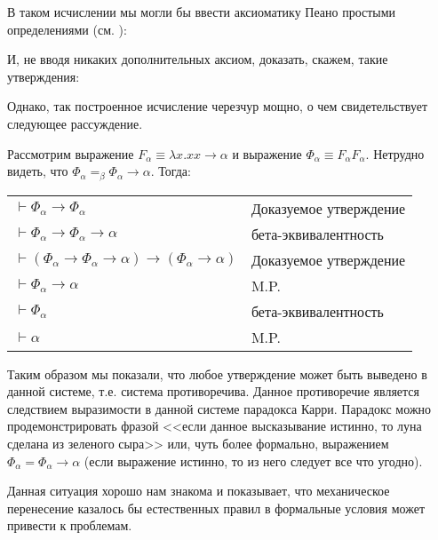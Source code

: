 В таком исчислении мы могли бы ввести аксиоматику Пеано простыми
определениями (см. ):

И, не вводя никаких дополнительных аксиом, доказать, скажем,
такие утверждения:

Однако, так построенное исчисление черезчур мощно, о чем свидетельствует
следующее рассуждение.

Рассмотрим выражение $F_\alpha \equiv \lambda x. x x \rightarrow \alpha$ 
и выражение $\Phi_\alpha \equiv F_\alpha F_\alpha$.
Нетрудно видеть, что $\Phi_\alpha =_\beta \Phi_\alpha\rightarrow\alpha$.
Тогда:

\begin{tabular}{ll}
$\vdash\Phi_\alpha\rightarrow\Phi_\alpha$ & Доказуемое утверждение\\
$\vdash\Phi_\alpha\rightarrow\Phi_\alpha\rightarrow\alpha$ & бета-эквивалентность\\
$\vdash(\Phi_\alpha\rightarrow\Phi_\alpha\rightarrow\alpha)\rightarrow(\Phi_\alpha\rightarrow\alpha)$ & Доказуемое утверждение\\
$\vdash\Phi_\alpha\rightarrow\alpha$ & M.P.\\
$\vdash\Phi_\alpha$ & бета-эквивалентность\\
$\vdash\alpha$ & M.P.
\end{tabular}

Таким образом мы показали, что любое утверждение может быть выведено в данной
системе, т.е. система противоречива. Данное противоречие является следствием выразимости
в данной системе парадокса Карри. Парадокс можно продемонстрировать фразой
<<если данное высказывание истинно, то луна сделана из зеленого сыра>> или, чуть более формально,
выражением $\Phi_\alpha = \Phi_\alpha\rightarrow\alpha$ (если выражение истинно, 
то из него следует все что угодно). 

Данная ситуация хорошо нам знакома и показывает, что механическое перенесение казалось бы 
естественных правил в формальные условия может привести к проблемам.

